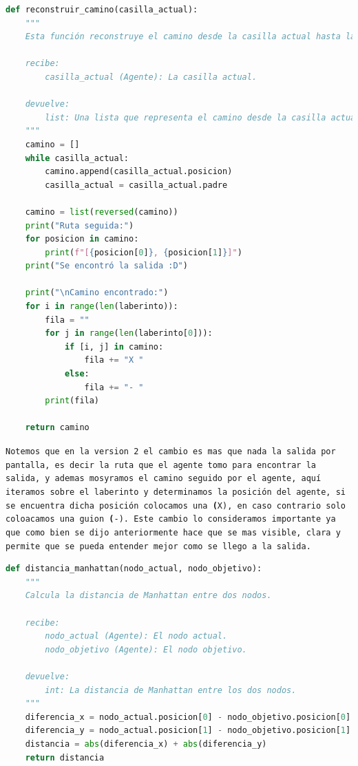 \begin{lstlisting}[language=Python, caption=Version 2: reconstruir_camino]
    def reconstruir_camino(casilla_actual):
    """
    Esta función reconstruye el camino desde la casilla actual hasta la posición inicial del agente.

    recibe:
        casilla_actual (Agente): La casilla actual.

    devuelve:
        list: Una lista que representa el camino desde la casilla actual hasta la posición inicial del agente.
    """
    camino = []
    while casilla_actual:
        camino.append(casilla_actual.posicion)
        casilla_actual = casilla_actual.padre

    camino = list(reversed(camino))
    print("Ruta seguida:")
    for posicion in camino:
        print(f"[{posicion[0]}, {posicion[1]}]")
    print("Se encontró la salida :D")  

    print("\nCamino encontrado:")
    for i in range(len(laberinto)):
        fila = ""
        for j in range(len(laberinto[0])):
            if [i, j] in camino:
                fila += "X "
            else:
                fila += "- "
        print(fila)

    return camino
\end{lstlisting}

{\tt Notemos que en la version 2 el cambio es mas que nada la salida por pantalla, es decir la ruta que el agente tomo para encontrar la salida, y ademas mosyramos el camino seguido por el agente, aquí iteramos sobre el laberinto y determinamos la posición del agente, si se encuentra dicha posición colocamos una \textbf(X), en caso contrario solo coloacamos una guion \textbf(-). Este cambio lo consideramos importante ya que como bien se dijo anteriormente hace que se mas visible, clara y permite que se pueda entender mejor como se llego a la salida.}

\begin{lstlisting}[language=Python, caption=Version 1: distancia_manhattan]
    def distancia_manhattan(nodo_actual, nodo_objetivo):
    """
    Calcula la distancia de Manhattan entre dos nodos.

    recibe:
        nodo_actual (Agente): El nodo actual.
        nodo_objetivo (Agente): El nodo objetivo.

    devuelve:
        int: La distancia de Manhattan entre los dos nodos.
    """
    diferencia_x = nodo_actual.posicion[0] - nodo_objetivo.posicion[0]
    diferencia_y = nodo_actual.posicion[1] - nodo_objetivo.posicion[1]
    distancia = abs(diferencia_x) + abs(diferencia_y)
    return distancia
\end{lstlisting}

